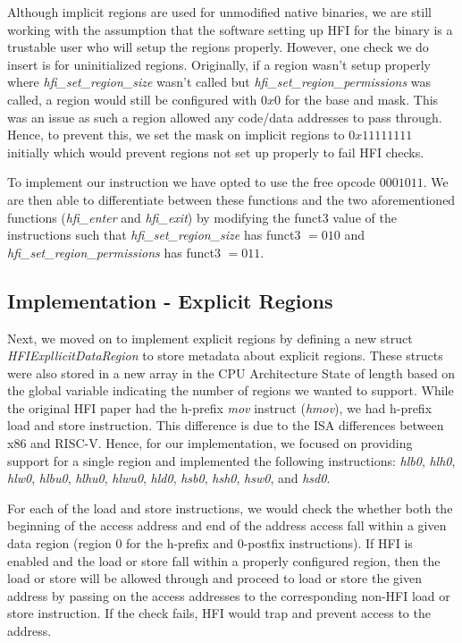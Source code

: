 \documentclass[conference,compsoc]{IEEEtran}
\begin{document}
Although implicit regions are used for unmodified native binaries, we are still working with the assumption that the software setting up HFI for the binary is a trustable user who will setup the regions properly. However, one check we do insert is for uninitialized regions. Originally, if a region wasn't setup properly where \textit{hfi\_set\_region\_size} wasn't called but \textit{hfi\_set\_region\_permissions} was called, a region would still be configured with $0x0$ for the base and mask. This was an issue as such a region allowed any code/data addresses to pass through. Hence, to prevent this, we set the mask on implicit regions to $0x11111111$ initially which would prevent regions not set up properly to fail HFI checks.

To implement our instruction we have opted to use the free opcode $0001011$.
We are then able to differentiate between these functions and the two aforementioned functions (\textit{hfi\_enter} and \textit{hfi\_exit}) by modifying the funct3 value of the instructions such that \textit{hfi\_set\_region\_size} has funct3 $= 010$ and \textit{hfi\_set\_region\_permissions} has funct3 $= 011$.

\subsection{Implementation - Explicit Regions}
Next, we moved on to implement explicit regions by defining a new struct \textit{HFIExpllicitDataRegion} to store metadata about explicit regions. These structs were also stored in a new array in the CPU Architecture State of length based on the global variable indicating the number of regions we wanted to support. While the original HFI paper had the h-prefix \textit{mov} instruct (\textit{hmov}), we had h-prefix load and store instruction. This difference is due to the ISA differences between x86 and RISC-V. Hence, for our implementation, we focused on providing support for a single region and implemented the following instructions: \textit{hlb0}, \textit{hlh0}, \textit{hlw0}, \textit{hlbu0}, \textit{hlhu0}, \textit{hlwu0}, \textit{hld0}, \textit{hsb0}, \textit{hsh0}, \textit{hsw0}, and \textit{hsd0}.

For each of the load and store instructions, we would check the whether both the beginning of the access address and end of the address access fall within a given data region (region 0 for the h-prefix and 0-postfix instructions). If HFI is enabled and the load or store fall within a properly configured region, then the load or store will be allowed through and proceed to load or store the given address by passing on the access addresses to the corresponding non-HFI load or store instruction. If the check fails, HFI would trap and prevent access to the address.
\end{document}
